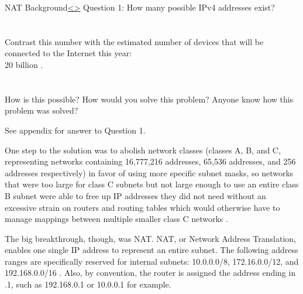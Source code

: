 \documentclass[12pt]{article}
\newenvironment{instructionblock}{\Large\bgroup}{\egroup}
\begin{document}
\pagebreak
\begin{slide}{NAT Background}{\hyperref[slide 16]{\textless}\hyperref[slide 18]{\textgreater}}
\begin{instructionblock}
Question 1: How many possible IPv4 addresses exist?
\\\\\\
Contrast this number with the estimated number of devices that will be connected to the Internet this year: \\20 billion \cite{ieeeiot}.
\\\\\\
How is this possible? How would you solve this problem? Anyone know how this problem was solved?
\end{instructionblock}
\end{slide}
See appendix for answer to Question 1.
\newline
\par One step to the solution was to abolish network classes (classes A, B, and C, representing networks containing 16,777,216 addresses, 65,536 addresses, and 256 addresses respectively) in favor of using more specific subnet masks, so networks that were too large for class C subnets but not large enough to use an entire class B subnet were able to free up IP addresses they did not need without an excessive strain on routers and routing tables which would otherwise have to manage mappings between multiple smaller class C networks \cite{arsipv4}.
\par The big breakthrough, though, was NAT. NAT, or Network Address Translation, enables one single IP address to represent an entire subnet. The following address ranges are specifically reserved for internal subnets: 10.0.0.0/8, 172.16.0.0/12, and 192.168.0.0/16 \cite{arsipv4}. Also, by convention, the router is assigned the address ending in .1, such as 192.168.0.1 or 10.0.0.1 for example.
\end{document}

